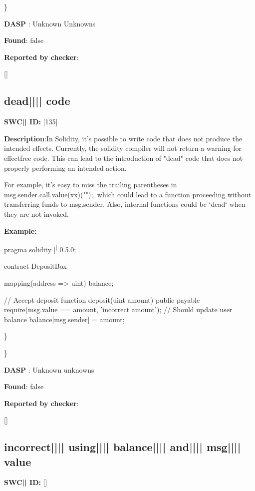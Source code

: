 \documentclass{article}
\begin{document}
\} 

\textbf{DASP} : Unknown Unknowns

\textbf{Found}: false

\textbf{Reported by checker}: 
\begin{ffcode} 

[]
\end{ffcode} 
\subsection{dead{||\textunderscore|| }code} 
\textbf{SWC{|\textunderscore| }ID:} [135]

\textbf{Description}:In Solidity, it's possible to write code that does not produce the intended effects. Currently, the solidity compiler will not return a warning for effect{\textendash}free code. This can lead to the introduction of "dead" code that does not properly performing an intended action.

For example, it's easy to miss the trailing parentheses in msg.sender.call.value(xx)("");, which could lead to a function proceeding without transferring funds to msg.sender. Also, internal functions could be `dead` when they are not invoked.


\textbf{Example:} 
\begin{ffcode} 

pragma solidity |\textsuperscript| 0.5.0;

contract DepositBox {
    mapping(address => uint) balance;

    // Accept deposit
    function deposit(uint amount) public payable {
        require(msg.value == amount, 'incorrect amount');
        // Should update user balance
        balance[msg.sender] = amount;
    }
}

\end{ffcode} 
\} 

\} 

\textbf{DASP} : Unknown unknowns

\textbf{Found}: false

\textbf{Reported by checker}: 
\begin{ffcode} 

[]
\end{ffcode} 
\subsection{incorrect{||\textunderscore|| }using{||\textunderscore|| }balance{||\textunderscore|| }and{||\textunderscore|| }msg{||\textunderscore|| }value} 
\textbf{SWC{|\textunderscore| }ID:} []
\end{document}
